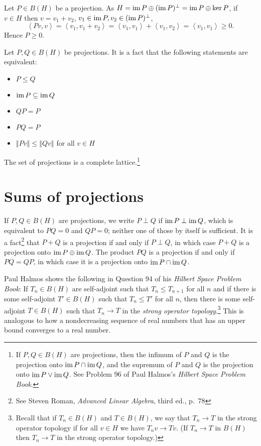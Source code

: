 \documentclass{article}
\newcommand{\inner}[2]{\left\langle #1, #2 \right\rangle}
\newcommand{\im}{\textrm{im\,}}
\newcommand{\norm}[1]{\left\Vert #1 \right\Vert}
\begin{document}
Let $P \in B(H)$ be a projection. As $H = \im P \oplus (\im P)^\perp=\im P \oplus \ker P$, if $v \in H$ then $v=v_1+v_2$, $v_1 \in \im P, v_2 \in (\im P)^\perp$,
\[
\inner{Pv}{v}=\inner{v_1}{v_1+v_2}=\inner{v_1}{v_1}+\inner{v_1}{v_2}=\inner{v_1}{v_1} \geq 0.
\]
Hence $P \geq 0$.

Let $P,Q \in B(H)$ be projections. It is a fact that the following statements are equivalent:
\begin{itemize}
\item $P \leq Q$
\item $\im P \subseteq \im Q$
\item $QP=P$
\item $PQ=P$
\item $\norm{Pv} \leq \norm{Qv}$ for all $v \in H$
\end{itemize}

The set of projections is a complete lattice.\footnote{If $P,Q \in B(H)$ are projections, then the infimum of $P$ and $Q$ is the projection onto
$\im P \cap \im Q$, and the supremum of $P$ and $Q$ is the projection onto $\im P \vee \im Q$.
See Problem 96 of  Paul Halmos's {\em Hilbert Space Problem Book}.}



\section{Sums of projections}
\label{sums}
If $P,Q \in B(H)$ are projections, we write $P \perp Q$ if $\im P \perp \im Q$, which is equivalent to $PQ=0$ and $QP=0$; neither one of those by itself is sufficient. It is a
fact\footnote{See Steven Roman,
{\em Advanced Linear Algebra}, third ed., p.~78} that $P+Q$ is a projection if and only if
$P \perp Q$, in which case $P+Q$ is a projection onto $\im P \oplus \im Q$. The product $PQ$ is a projection if and only if
$PQ=QP$, in which case it is a projection onto $\im P \cap \im Q$. 


Paul Halmos shows the following in Question 94 of his {\em Hilbert Space Problem Book}: If $T_n \in B(H)$ are self-adjoint such that
$T_n \leq T_{n+1}$ for all $n$ and if there is some self-adjoint
$T' \in B(H)$ such that
$T_n \leq T'$ for all $n$, then 
there is some self-adjoint $T \in B(H)$ such that $T_n \to T$ in the {\em strong operator topology}.\footnote{Recall that if $T_n \in B(H)$ and $T \in B(H)$, we say that $T_n \to T$ in the strong
operator topology if for all $v \in H$ we have $T_n v \to Tv$. (If $T_n \to T$ in $B(H)$ then $T_n \to T$ in the strong operator topology.)} This is analogous to how a nondecreasing
sequence of real numbers that has an upper bound converges to a real number.
\end{document}
